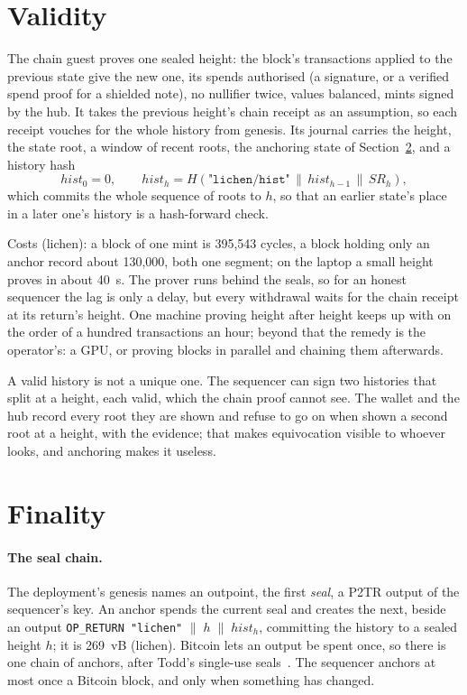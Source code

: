 \documentclass[11pt]{article}
\newcommand{\tx}[1]{\texttt{#1}}
\begin{document}
\section{Validity}
\label{sec:validity}

The chain guest proves one sealed height: the block's transactions
applied to the previous state give the new one, its spends authorised (a
signature, or a verified spend proof for a shielded note), no nullifier
twice, values balanced, mints signed by the hub. It takes the previous
height's chain receipt as an assumption, so each receipt vouches for the
whole history from genesis. Its journal carries the height, the state
root, a window of recent roots, the anchoring state of
Section~\ref{sec:finality}, and a history hash
\[
  \mathit{hist}_0 = 0, \qquad
  \mathit{hist}_h = H(\texttt{"lichen/hist"} \,\|\, \mathit{hist}_{h-1} \,\|\, \mathit{SR}_h),
\]
which commits the whole sequence of roots to $h$, so that an earlier
state's place in a later one's history is a hash-forward check.

Costs (lichen): a block of one mint is 395,543 cycles, a block holding
only an anchor record about 130,000, both one segment; on the laptop a
small height proves in about 40~s. The prover runs behind the seals, so
for an honest sequencer the lag is only a delay, but every withdrawal
waits for the chain receipt at its return's height. One machine proving
height after height keeps up with on the order of a hundred
transactions an hour; beyond that the remedy is the operator's: a GPU,
or proving blocks in parallel and chaining them afterwards.

A valid history is not a unique one. The sequencer can sign two
histories that split at a height, each valid, which the chain proof
cannot see. The wallet and the hub record every root they are shown and
refuse to go on when shown a second root at a height, with the evidence;
that makes equivocation visible to whoever looks, and anchoring makes it
useless.

\section{Finality}
\label{sec:finality}

\paragraph{The seal chain.} The deployment's genesis names an outpoint,
the first \emph{seal}, a P2TR output of the sequencer's key. An anchor
spends the current seal and creates the next, beside an output
\tx{OP\_RETURN "lichen"} $\| \; h \;\|\; \mathit{hist}_h$, committing the
history to a sealed height $h$; it is 269~vB (lichen). Bitcoin lets an
output be spent once, so there is one chain of anchors, after Todd's
single-use seals~\cite{toddseals}. The sequencer anchors at most once a
Bitcoin block, and only when something has changed.
\end{document}

